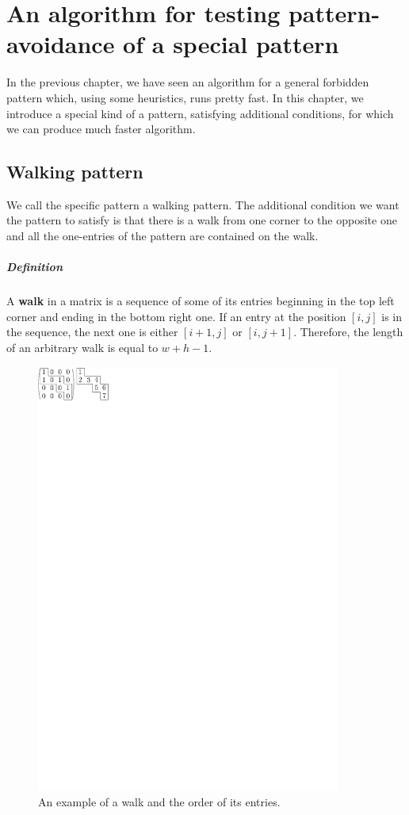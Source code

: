 \chapter{An algorithm for testing pattern-avoidance of a special pattern}
In the previous chapter, we have seen an algorithm for a general forbidden pattern which, using some heuristics, runs pretty fast. In this chapter, we introduce a special kind of a pattern, satisfying additional conditions, for which we can produce much faster algorithm.

\section{Walking pattern}
We call the specific pattern a walking pattern. The additional condition we want the pattern to satisfy is that there is a walk from one corner to the opposite one and all the one-entries of the pattern are contained on the walk.
\paragraph{Definition}
A \textbf{walk} in a matrix is a sequence of some of its entries beginning in the top left corner and ending in the bottom right one. If an entry at the position $[i,j]$ is in the sequence, the next one is either $[i+1,j]$ or $[i,j+1]$. Therefore, the length of an arbitrary walk is equal to $w+h-1$.
\begin{figure}[h!]
\centering
\includegraphics[width=100mm]{../img/walk.pdf}
\caption{An example of a walk and the order of its entries.}
\label{walk}
\end{figure}

